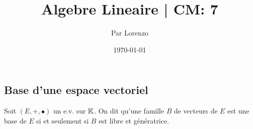 \documentclass[a4paper, 12pt]{article}
\title{Algebre Lineaire | CM: 7}
\author{Par Lorenzo}
\date{\today}
\begin{document}
\maketitle

\subsection{Base d'une espace vectoriel}

\begin{definition}
    Soit $(E, +, \bullet)$ un e.v. sur $\mathbb{K}$. On dit qu'une famille $B$ de vecteurs de $E$ est une base de $E$ si et seulement si $B$ est libre et génératrice.
\end{definition}
\end{document}
